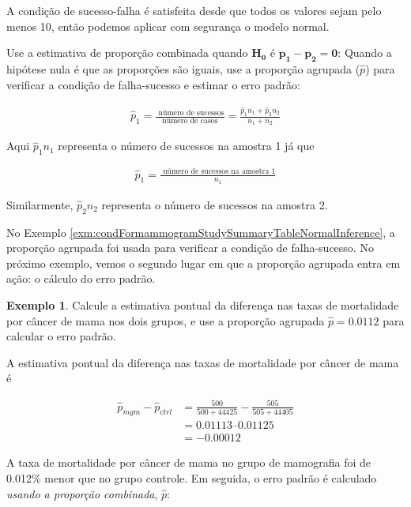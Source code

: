 \documentclass[
]{book}
\theoremstyle{definition}
\theoremstyle{definition}
\newtheorem{example}{Exemplo}[chapter]
\theoremstyle{definition}
\theoremstyle{definition}
\theoremstyle{remark}
\begin{document}
A condição de sucesso-falha é satisfeita desde que todos os valores sejam pelo menos 10, então podemos aplicar com segurança o modelo normal.

Use a estimativa de proporção combinada quando \(\mathbf{H_0}\) é \(\mathbf{p_1 - p_2 = 0}\): Quando a hipótese nula é que as proporções são iguais, use a proporção agrupada (\(\hat{p}\)) para verificar a condição de falha-sucesso e estimar o erro padrão:

\begin{eqnarray*}
\hat{p}_1 = \frac{\text{ número de sucessos}}{\text{número de casos}} = \frac{\hat{p}_1n_1 + \hat{p}_2n_2}{n_1 + n_2}
\end{eqnarray*}

Aqui \(\hat{p}_1n_1\) representa o número de sucessos na amostra 1 já que

\begin{eqnarray*}
\hat{p}_1 = \frac{\text{ número de sucessos na amostra 1}}{n_1}
\end{eqnarray*}

Similarmente, \(\hat{p}_2n_2\) representa o número de sucessos na amostra 2.

No Exemplo \ref{exm:condFormammogramStudySummaryTableNormalInference}, a proporção agrupada foi usada para verificar a condição de falha-sucesso. No próximo exemplo, vemos o segundo lugar em que a proporção agrupada entra em ação: o cálculo do erro padrão.

\begin{example}
\protect\hypertarget{exm:unnamed-chunk-233}{}{\label{exm:unnamed-chunk-233} } Calcule a estimativa pontual da diferença nas taxas de mortalidade por câncer de mama nos dois grupos, e use a proporção agrupada \(\hat{p} = 0.0112\) para calcular o erro padrão.
\end{example}

A estimativa pontual da diferença nas taxas de mortalidade por câncer de mama é

\begin{align*}
\hat{p}_{mgm} - \hat{p}_{ctrl}
    &= \frac{500}{500 + 44425} - \frac{505}{505 + 44405} \\
    &= 0.01113 – 0.01125 \\
    &= -0.00012
\end{align*}

A taxa de mortalidade por câncer de mama no grupo de mamografia foi de 0.012\% menor que no grupo controle. Em seguida, o erro padrão é calculado \emph{usando a proporção combinada}, \(\hat{p}\):
\end{document}
